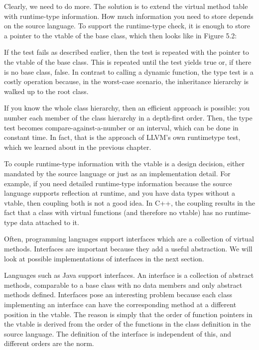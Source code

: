 Clearly, we need to do more. The solution is to extend the virtual method table with runtime-type information. How much information you need to store depends on the source language. To support the runtime-type check, it is enough to store a pointer to the vtable of the base class, which then looks like in Figure 5.2:


If the test fails as described earlier, then the test is repeated with the pointer to the vtable of the base class. This is repeated until the test yields true or, if there is no base class, false. In contrast to calling a dynamic function, the type test is a costly operation because, in the worst-case scenario, the inheritance hierarchy is walked up to the root class.

If you know the whole class hierarchy, then an efficient approach is possible: you number each member of the class hierarchy in a depth-first order. Then, the type test becomes compare-against-a-number or an interval, which can be done in constant time. In fact, that is the approach of LLVM’s own runtimetype test, which we learned about in the previous chapter.

To couple runtime-type information with the vtable is a design decision, either mandated by the source language or just as an implementation detail. For example, if you need detailed runtime-type information because the source language supports reflection at runtime, and you have data types without a vtable, then coupling both is not a good idea. In C++, the coupling results in the fact that a class with virtual functions (and therefore no vtable) has no runtime-type data attached to it.

Often, programming languages support interfaces which are a collection of virtual methods. Interfaces are important because they add a useful abstraction. We will look at possible implementations of interfaces in the next section.


Languages such as Java support interfaces. An interface is a collection of abstract methods, comparable to a base class with no data members and only abstract methods defined. Interfaces pose an interesting problem because each class implementing an interface can have the corresponding method at a different position in the vtable. The reason is simply that the order of function pointers in the vtable is derived from the order of the functions in the class definition in the source language. The definition of the interface is independent of this, and different orders are the norm.

